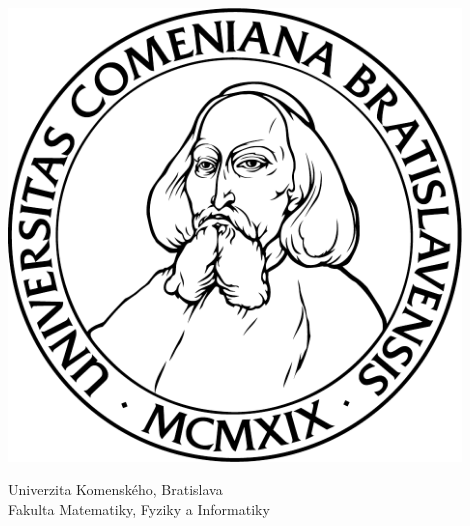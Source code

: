 \begin{titlepage}
	\begin{minipage}{0.2\textwidth}
	\includegraphics[width=0.9\textwidth]{komlogo-new.pdf}
	\end{minipage}
	\begin{minipage}{0.8\textwidth}
	\begin{center}
		\sc
		Univerzita Komenského, Bratislava \\
		Fakulta Matematiky, Fyziky a Informatiky 
	\end{center}
	\end{minipage}
	
	\vspace*{\fill}
	\begin{center}
	{\LARGE\sc\mftitle} \\
	\smallskip	
	\mfthesistype
	\end{center}
	\vspace*{\fill}
	
	
	\begin{figure}[!h]
		\smallskip
		\smallskip
		\textbf{\mfplacedate} \\
		\hspace{1pt} \textbf{\mfauthor}
	\end{figure}
\end{titlepage}